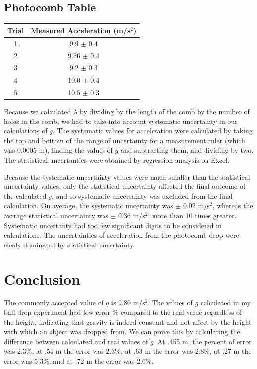 \documentclass[11pt]{report}
\begin{document}
\subsection*{Photocomb Table}
\begin{center}
    \begin{tabular}{| c | c |}
        \hline
        Trial & Measured Acceleration (m/s$^2$) \\
        \hline
        1 & 9.9 $\pm$ 0.4 \\
        \hline
        2 & 9.56 $\pm$ 0.4 \\
        \hline
        3 & 9.2 $\pm$ 0.3 \\
        \hline
        4 & 10.0 $\pm$ 0.4 \\
        \hline
        5 & 10.5 $\pm$ 0.3 \\
        \hline
    \end{tabular}
\end{center}

\setlength{\parindent}{5ex}
Because we calculated $\lambda$ by dividing by the length of the comb by the
number of holes in the comb, we had to take into account systematic uncertainty
in our calculations of \(g\).  The systematic values for
acceleration were calculated by taking the top and bottom of the range of
uncertainty for a measurement ruler (which was 0.0005 m), finding the values of
\(g\) and subtracting them, and dividing by two.  The statistical uncertanties 
were obtained by regression analysis on Excel.  

Because the systematic uncertainty values were much smaller than the statistical 
uncertainty values, only the statistical uncertainty affected the final outcome 
of the calculated \(g\), and so systematic uncertainty was excluded from the
final calculation. On average, the systematic uncertainty was $\pm$ 0.02 m/s$^2$,
whereas the average statistical uncertainty was $\pm$ 0.36 m/s$^2$, more than 10 times
greater. Systematic uncertanty had too few significant digits to be considered
in calculations.  The uncertainties of acceleration from the photocomb drop were
clealy dominated by statistical uncertainty.    

\section*{Conclusion}
The commonly accepted value of \(g\) is 9.80 m/s$^2$. The values of \(g\)
calculated in my ball drop experiment had low error $\%$ compared to the real
value regardless of the height, indicating that gravity is indeed constant and not
affect by the height with which an object was dropped from.  We can prove this
by calculating the difference between calculated and real values of
\(g\).  At .455 m, the percent of error was 2.3$\%$, at .54 m the error was 2.3$\%$, 
at .63 m the error was 2.8$\%$, at .27 m the error was 5.3$\%$, and at .72 m the 
error was 2.6$\%$.  
\end{document}
